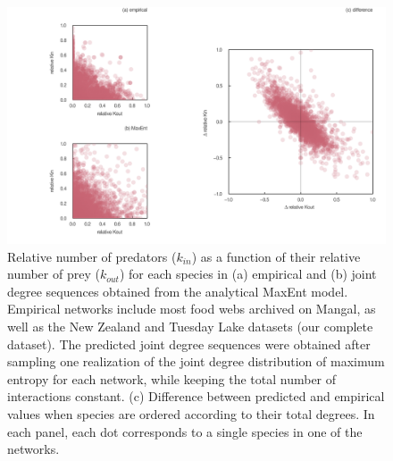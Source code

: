 \documentclass[10pt,oneside]{article}
\makeatletter
\def\maxwidth{\ifdim\Gin@nat@width>\linewidth\linewidth
\else\Gin@nat@width\fi}
\let\Oldincludegraphics\includegraphics
\renewcommand{\includegraphics}[1]{\Oldincludegraphics[width=\maxwidth]{#1}}
\makeatother
\begin{document}
\begin{figure}
\hypertarget{fig:joint_dd}{%
\centering
\includegraphics{figures/joint_degree_dist.png}
\caption{Relative number of predators (\(k_{in}\)) as a function of
their relative number of prey (\(k_{out}\)) for each species in (a)
empirical and (b) joint degree sequences obtained from the analytical
MaxEnt model. Empirical networks include most food webs archived on
Mangal, as well as the New Zealand and Tuesday Lake datasets (our
complete dataset). The predicted joint degree sequences were obtained
after sampling one realization of the joint degree distribution of
maximum entropy for each network, while keeping the total number of
interactions constant. (c) Difference between predicted and empirical
values when species are ordered according to their total degrees. In
each panel, each dot corresponds to a single species in one of the
networks.}\label{fig:joint_dd}
}
\end{figure}
\end{document}
